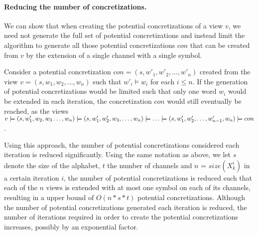 \paragraph{Reducing the number of concretizations.}
We can show that when creating the potential concretizations of a view $v$, we need not generate the full set of potential concretizations and instead limit the algorithm to generate all those potential concretizations $con$ that can be created from $v$ by the extension of a single channel with a single symbol.

Consider a potential concretization $con = (s, w'_1, w'_2, \ldots, w'_n)$ created from the view $v = (s, w_1, w_2, \ldots, w_n)$ such that $w'_i \models w_i$ for each $i \leq n$. If the generation of potential concretizations would be limited such that only one word $w_i$ would be extended in each iteration, the concretization $con$ would still eventually be reached, as the views $v \models (s, w'_1, w_2, w_3 \ldots, w_n) \models (s, w'_1, w'_2, w_3, \ldots, w_n) \models \ldots \models (s, w'_1, w'_2, \ldots, w'_{n-1}, w_n) \models con$.

Using this approach, the number of potential concretizations considered each iteration is reduced significantly. Using the same notation as above, we let $s$ denote the size of the alphabet, $t$ the number of channels and $n$ = $size(X_k^i)$ in a certain iteration $i$, the number of potential concretizations is reduced such that each of the $n$ views is extended with at most one symbol on each of its channels, resulting in a upper bound of $O(n*s*t)$ potential concretizations. Although the number of potential concretizations generated each iteration is reduced, the number of iterations required in order to create the potential concretizations increases, possibly by an exponential factor.

